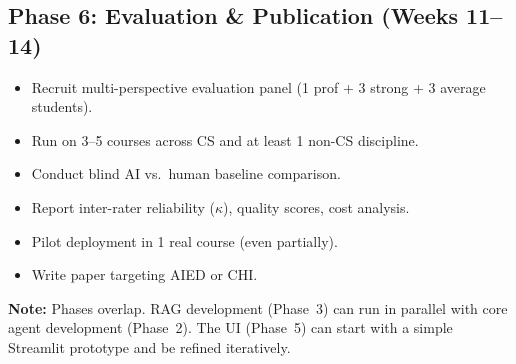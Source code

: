 \documentclass[11pt,a4paper]{article}
\begin{document}
\subsection{Phase 6: Evaluation \& Publication (Weeks 11--14)}
\begin{itemize}[nosep]
    \item Recruit multi-perspective evaluation panel (1 prof + 3 strong + 3 average students).
    \item Run on 3--5 courses across CS and at least 1 non-CS discipline.
    \item Conduct blind AI vs.\ human baseline comparison.
    \item Report inter-rater reliability ($\kappa$), quality scores, cost analysis.
    \item Pilot deployment in 1 real course (even partially).
    \item Write paper targeting AIED or CHI.
\end{itemize}

\begin{purplebox}
\textbf{Note:} Phases overlap. RAG development (Phase~3) can run in parallel with core agent development (Phase~2). The UI (Phase~5) can start with a simple Streamlit prototype and be refined iteratively.
\end{purplebox}

\end{document}
